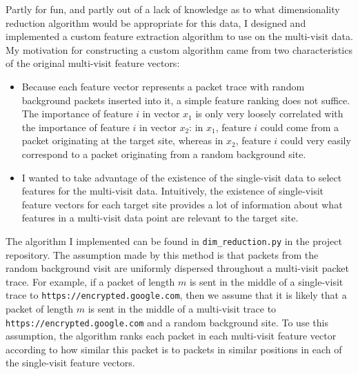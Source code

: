 \documentclass[10pt, twocolumn]{article}
\begin{document}
Partly for fun, and partly out of a lack of knowledge as to what dimensionality reduction algorithm would be appropriate for this data, I 
designed and implemented a custom feature extraction algorithm to use on the multi-visit data. My motivation for constructing a custom 
algorithm came from two characteristics of the original multi-visit feature vectors:
\begin{itemize}
\item Because each feature vector represents a packet trace with random background packets inserted into it, a simple 
feature ranking does not suffice. The importance of feature $i$ in vector $x_{1}$ is only very loosely correlated with the 
importance of feature $i$ in vector $x_{2}$: in $x_{1}$, feature $i$ could come from a packet originating at the target site, 
whereas in $x_2$, feature $i$ could very easily correspond to a packet originating from a random background site.
\item I wanted to take advantage of the existence of the single-visit data to select features for the multi-visit data. 
Intuitively, the existence of single-visit feature vectors for each target site provides a lot of information about what 
features in a multi-visit data point are relevant to the target site.
\end{itemize}

The algorithm I implemented can be found in \texttt{dim\_reduction.py} in the project repository. The assumption made by this method 
is that packets from the random background visit are uniformly dispersed throughout a multi-visit packet trace. For example, if a packet 
of length $m$ is sent in the middle of a single-visit trace to \texttt{https://encrypted.google.com}, then we assume that it is 
likely that a packet of length $m$ is sent in the middle of a multi-visit trace to \texttt{https://encrypted.google.com} and a random
background site. To use this assumption, the algorithm ranks each packet in each multi-visit feature vector according to how similar 
this packet is to packets in similar positions in each of the single-visit feature vectors.
\end{document}
